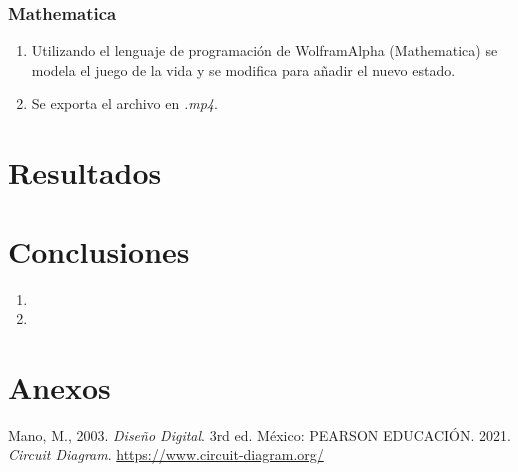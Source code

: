 \documentclass[conference]{IEEEtran}
\begin{document}
        
	\subsubsection{Mathematica}
        \begin{enumerate}
            \item Utilizando el lenguaje de programación de WolframAlpha (Mathematica) se modela el juego de la vida y se modifica para añadir el nuevo estado.
            \item Se exporta el archivo en \textit{.mp4}.
        \end{enumerate}        
        
        
        
        
\section{Resultados}
    
\section{Conclusiones}
\begin{enumerate}
    \item 
    \item 
\end{enumerate}

\section{Anexos}
    
    
    
    
\begin{thebibliography}{00}
 Mano, M., 2003. \textit{Diseño Digital}. 3rd ed. México: PEARSON EDUCACIÓN.
 2021. \textit{Circuit Diagram}. \url{https://www.circuit-diagram.org/}
\end{thebibliography}
\end{document}
